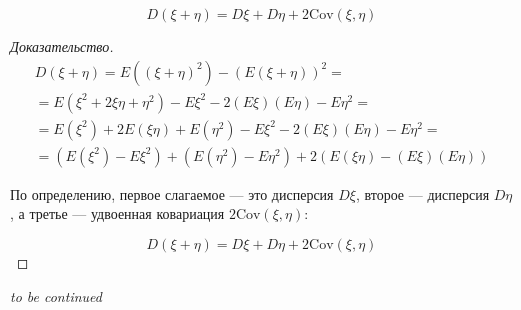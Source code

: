 \begin{statement}
$$ D(\xi + \eta) = D\xi + D\eta + 2\text{Cov}(\xi, \eta) $$
\end{statement}

\begin{proof}[Доказательство]
\leavevmode

\begin{gather*}
D(\xi + \eta) = E((\xi + \eta)^2) - (E(\xi + \eta))^2 = \\
= E(\xi^2 + 2 \xi \eta + \eta^2) - E\xi^2 - 2 (E\xi) (E\eta) - E\eta^2 = \\
= E(\xi^2) + 2 E(\xi \eta) + E(\eta^2) - E\xi^2 - 2 (E\xi) (E\eta) - E\eta^2 = \\
= \left(E(\xi^2) - E\xi^2\right) + \left(E(\eta^2) - E\eta^2\right) + 2 \left(E(\xi \eta) - (E\xi) (E\eta)\right)
\end{gather*}

По определению, первое слагаемое — это дисперсия $D\xi$, второе — дисперсия $D\eta$, а третье — удвоенная ковариация $2\text{Cov}(\xi, \eta)$:
 
$$D(\xi + \eta) = D\xi + D\eta + 2\text{Cov}(\xi, \eta)$$

\end{proof}

\vfill


\begin{flushright}
    \textit{to be continued}
\end{flushright}